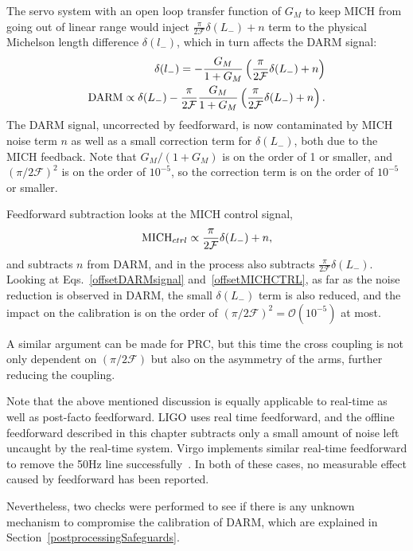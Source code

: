The servo system with an open loop transfer function of $G_M$ to keep MICH from going out of linear range would inject $\frac{\pi}{2 \mathcal{F}} \delta(L_-) + n$ term to the physical Michelson length difference $\delta(l_-)$, which in turn affects the DARM signal:
\begin{eqnarray}
\delta(l_{-}) = - \frac{G_M}{1+G_M} \left( \frac{\pi}{2 \mathcal{F}}\delta(L_-) + n \right) \label{offsetMICHsignal}\\
%
\textup{DARM} \propto \delta(L_-) -\frac{\pi}{2 \mathcal{F}} \frac{G_M}{1+G_M} \left( \frac{\pi}{2 \mathcal{F}}\delta(L_-) + n \right). \label{offsetDARMsignal}
\end{eqnarray}
The DARM signal, uncorrected by feedforward, is now contaminated by MICH noise term $n$ as well as a small correction term for $ \delta(L_-)$, both due to the MICH feedback. Note that $G_M/(1+G_M)$ is on the order of 1 or smaller, and  $(\pi/2 \mathcal{F})^2$ is on the order of $10^{-5}$, so the correction term is on the order of $10^{-5}$ or smaller.

Feedforward subtraction looks at the MICH control signal,
\begin{equation}
\textup{MICH}_{ctrl} \propto \frac{\pi}{2\mathcal{F}}\delta(L_-) +n,\label{offsetMICHCTRL}
\end{equation}
and subtracts $n$ from DARM, and in the process also subtracts $\frac{\pi}{2\mathcal{F}}\delta(L_-)$. Looking at Eqs.~\ref{offsetDARMsignal} and~\ref{offsetMICHCTRL}, as far as the noise reduction is observed in DARM, the small $\delta(L_-)$ term is also reduced, and the impact on the calibration is on the order of $(\pi/2 \mathcal{F})^2=\mathcal{O}(10^{-5})$ at most.

A similar argument can be made for PRC, but this time the cross coupling is not only dependent on $(\pi/2\mathcal{F})$ but also on the asymmetry of the arms, further reducing the coupling.

Note that the above mentioned discussion is equally applicable to real-time as well as post-facto feedforward. LIGO uses real time feedforward, and the offline feedforward described in this chapter subtracts only a small amount of noise left uncaught by the real-time system. Virgo implements similar real-time feedforward to remove the 50Hz line successfully~\cite{Buskulic2000}. In both of these cases, no measurable effect caused by feedforward has been reported.

Nevertheless, two checks were performed to see if there is any unknown mechanism to compromise the calibration of DARM, which are explained in Section~\ref{postprocessingSafeguards}.

